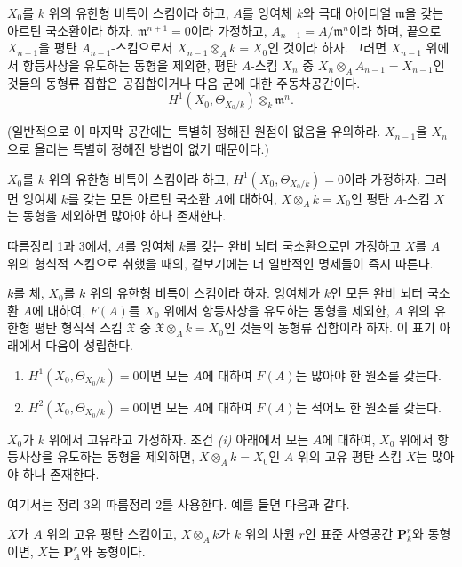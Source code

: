  $X_0$를 $k$ 위의 유한형 비특이 스킴이라 하고,
$A$를 잉여체 $k$와 극대 아이디얼
$\mathfrak m$을 갖는 아르틴 국소환이라 하자. $\mathfrak m^{n+1}=0$이라 가정하고,
$A_{n-1}=A/\mathfrak m^n$이라 하며, 끝으로 $X_{n-1}$을 평탄
$A_{n-1}$-스킴으로서 $X_{n-1}\otimes_A k=X_0$인 것이라 하자. 그러면
$X_{n-1}$ 위에서 항등사상을 유도하는 동형을 제외한, 평탄
$A$-스킴 $X_n$ 중 $X_n\otimes_A A_{n-1}=X_{n-1}$인 것들의
동형류 집합은 공집합이거나
다음 군에 대한 주동차공간이다.
\[
  H^1(X_0,\Theta_{X_0/k})\otimes_k\mathfrak m^n.
\]

(일반적으로 이 마지막 공간에는 특별히 정해진 원점이 없음을 유의하라.
$X_{n-1}$을 $X_n$으로 올리는 특별히 정해진 방법이 없기
때문이다.)

 $X_0$를 $k$ 위의 유한형 비특이 스킴이라 하고,
$H^1(X_0,\Theta_{X_0/k})=0$이라 가정하자. 그러면 잉여체 $k$를 갖는 모든
아르틴 국소환 $A$에 대하여, $X\otimes_A k=X_0$인 평탄
$A$-스킴 $X$는 동형을 제외하면 많아야 하나 존재한다.

따름정리 1과 3에서, $A$를 잉여체 $k$를 갖는 완비 뇌터
국소환으로만 가정하고 $X$를
$A$ 위의 형식적 스킴으로 취했을 때의, 겉보기에는 더 일반적인 명제들이 즉시 따른다.

 $k$를 체, $X_0$를 $k$ 위의 유한형 비특이 스킴이라
하자. 잉여체가 $k$인 모든 완비 뇌터 국소환 $A$에 대하여,
$F(A)$를 $X_0$ 위에서 항등사상을 유도하는 동형을 제외한, $A$ 위의
유한형 평탄 형식적 스킴 $\mathfrak X$ 중
$\mathfrak X\otimes_A k=X_0$인 것들의 동형류 집합이라 하자. 이 표기 아래에서 다음이 성립한다.
\begin{enumerate}
  \item[\textit{i.}] $H^1(X_0,\Theta_{X_0/k})=0$이면 모든 $A$에 대하여
    $F(A)$는 많아야 한 원소를 갖는다.
  \item[\textit{ii.}] $H^2(X_0,\Theta_{X_0/k})=0$이면 모든 $A$에 대하여
    $F(A)$는 적어도 한 원소를 갖는다.
\end{enumerate}

 $X_0$가 $k$ 위에서 고유라고 가정하자. 조건
\textit{(i)} 아래에서 모든 $A$에 대하여, $X_0$ 위에서 항등사상을
유도하는 동형을 제외하면, $X\otimes_A k=X_0$인
$A$ 위의 고유 평탄 스킴 $X$는 많아야 하나 존재한다.

여기서는 정리 3의 따름정리 2를 사용한다. 예를 들면 다음과 같다.

 $X$가 $A$ 위의 고유 평탄 스킴이고,
$X\otimes_A k$가 $k$ 위의 차원 $r$인 표준 사영공간
$\mathbf P_k^r$와 동형이면, $X$는 $\mathbf P_A^r$와 동형이다.

